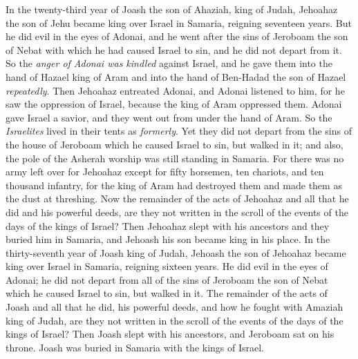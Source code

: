 \begin{biblechapter} %
 In the twenty-third year of Joash the son of Ahaziah, king of Judah, Jehoahaz the son of Jehu became king over Israel in Samaria, reigning seventeen years.
\verse But he did evil in the eyes of Adonai, and he went after the sins of Jeroboam the son of Nebat with which he had caused Israel to sin, and he did not depart from it.
\verse So the \textit{anger of Adonai was kindled} against Israel, and he gave them into the hand of Hazael king of Aram and into the hand of Ben-Hadad the son of Hazael \textit{repeatedly}.
\verse Then Jehoahaz entreated Adonai, and Adonai listened to him, for he saw the oppression of Israel, because the king of Aram oppressed them.
\verse Adonai gave Israel a savior, and they went out from under the hand of Aram. So the \textit{Israelites} lived in their tents as \textit{formerly}.
\verse Yet they did not depart from the sins of the house of Jeroboam which he caused Israel to sin, but walked in it; and also, the pole of the Asherah worship was still standing in Samaria.
\verse For there was no army left over for Jehoahaz except for fifty horsemen, ten chariots, and ten thousand infantry, for the king of Aram had destroyed them and made them as the dust at threshing.
\verse Now the remainder of the acts of Jehoahaz and all that he did and his powerful deeds, are they not written in the scroll of the events of the days of the kings of Israel?
\verse Then Jehoahaz slept with his ancestors and they buried him in Samaria, and Jehoash his son became king in his place.
\verse In the thirty-seventh year of Joash king of Judah, Jehoash the son of Jehoahaz became king over Israel in Samaria, reigning sixteen years.
\verse He did evil in the eyes of Adonai; he did not depart from all of the sins of Jeroboam the son of Nebat which he caused Israel to sin, but walked in it.
\verse The remainder of the acts of Joash and all that he did, his powerful deeds, and how he fought with Amaziah king of Judah, are they not written in the scroll of the events of the days of the kings of Israel?
\verse Then Joash slept with his ancestors, and Jeroboam sat on his throne. Joash was buried in Samaria with the kings of Israel.

\end{biblechapter}
